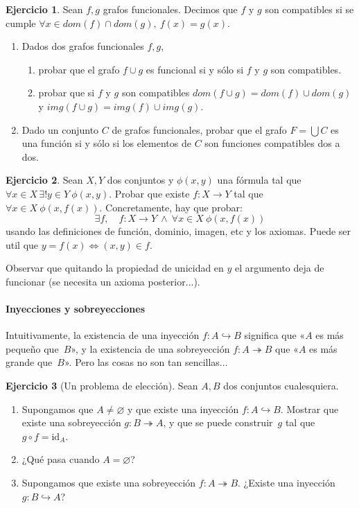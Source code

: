 \documentclass[a4paper,12pt]{book}
\newcommand{\Lra}{\Leftrightarrow}
\def\id{\mathrm{id}}
\def\into{\hookrightarrow}
\def\onto{\twoheadrightarrow}
\def\id{\mathrm{id}}
\def\into{\hookrightarrow}
\def\onto{\twoheadrightarrow}
\theoremstyle{definition}
\newtheorem{ejercicio}{Ejercicio}
\begin{document}
	\begin{ejercicio}
		Sean $f,g$ grafos funcionales. Decimos que $f$ y $g$ son compatibles si se cumple $\forall x \in dom(f)\cap dom(g),~f(x)=g(x)$.
		\begin{enumerate}\parskip -.5ex
			\item Dados dos grafos funcionales $f,g$, \begin{enumerate}\parskip -.5ex
				\item probar que el grafo $f\cup g$ es funcional si y s\'olo si $f$ y $g$ son compatibles. 
				
				\item probar que si $f$ y $g$ son compatibles $dom(f\cup g)=dom(f)\cup dom(g)$ y $img(f\cup g)=img(f)\cup img(g)$.
			\end{enumerate}
			\item Dado un conjunto $C$ de grafos funcionales, probar que el grafo $F=\bigcup C$ es una funci\'on si y s\'olo si los elementos de $C$ son funciones compatibles dos a dos.
		\end{enumerate}
	\end{ejercicio}
	
	\begin{ejercicio}
		Sean $X,Y$ dos conjuntos y $\phi(x,y)$ una fórmula tal que $\forall x\in X\,\exists!y\in Y~\phi(x,y)$. Probar que existe $f:X\to Y$ tal que $\forall x\in X~\phi(x,f(x))$. Concretamente, hay que probar:
		$$\exists f,\quad f:X\to Y~\wedge~\forall x\in X~\phi(x,f(x))
		$$
		usando las definiciones de función, dominio, imagen, etc y los axiomas. Puede ser util que $y=f(x)\Lra (x,y)\in f$.
		
		Observar que quitando la propiedad de unicidad en $y$ el argumento deja de funcionar (se necesita un axioma posterior...).
	\end{ejercicio}
	


	
	\paragraph*{Inyecciones y sobreyecciones}
	Intuitivamente, la existencia de una inyección $f:A\into B$ significa
	que «$A$ es más pequeño que~$B$», y la existencia de una sobreyección
	$f:A\onto B$ que «$A$ es más grande que~$B$».
	Pero las cosas no son tan sencillas...
	
	\begin{ejercicio}[Un problema de elección]
		Sean $A,B$ dos conjuntos cualesquiera.
		\begin{enumerate}
			\item[(1)] Supongamos que $A\neq\varnothing$ y que existe una
			inyección $f:A\into B$.
			Mostrar que existe una sobreyección $g:B\onto A$, y que se puede
			construir~$g$ tal que $g\circ f=\id_A$.
			\item[(2)] ¿Qué pasa cuando $A=\varnothing$?
			\item[(3)] Supongamos que existe una sobreyección $f:A\onto B$.
			¿Existe una inyección $g:B\into A$?
		\end{enumerate}

	\end{ejercicio}
	
\end{document}
